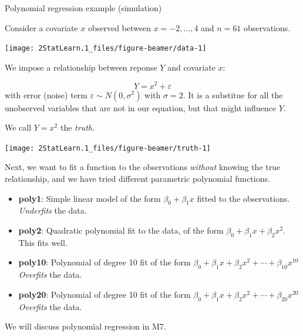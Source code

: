 \documentclass[ignorenonframetext,]{beamer}
\begin{document}
\begin{frame}

\begin{block}{Polynomial regression example (simulation)}

Consider a covariate \(x\) observed between \(x=-2, \ldots , 4\) and
\(n=61\) observations.

\begin{center}\texttt{[image: 2StatLearn.1\_files/figure-beamer/data-1]} \end{center}

\end{block}

\end{frame}

\begin{frame}

We impose a relationship between reponse \(Y\) and covariate \(x\):

\[ Y=x^2 + \varepsilon\] with error (noise) term
\(\varepsilon\sim N(0,\sigma^2)\) with \(\sigma=2\). It is a substitue
for all the unobserved variables that are not in our equation, but that
might influence \(Y\).

We call \(Y=x^2\) the \emph{truth}.

\end{frame}

\begin{frame}

\begin{center}\texttt{[image: 2StatLearn.1\_files/figure-beamer/truth-1]} \end{center}

\end{frame}

\begin{frame}

Next, we want to fit a function to the observations \emph{without}
knowing the true relationship, and we have tried different parametric
polynomial functions.

\begin{itemize}
\item
  \textbf{poly1}: Simple linear model of the form \(\beta_0+\beta_1 x\)
  fitted to the observations. \emph{Underfits} the data.
\item
  \textbf{poly2}: Quadratic polynomial fit to the data, of the form
  \(\beta_0+\beta_1 x +\beta_2 x^2\). This fits well.
\item
  \textbf{poly10}: Polynomial of degree 10 fit of the form
  \(\beta_0+\beta_1 x +\beta_2 x^2+\cdots +\beta_{10}x^{10}\)
  \emph{Overfits} the data.
\item
  \textbf{poly20}: Polynomial of degree 10 fit of the form
  \(\beta_0+\beta_1 x +\beta_2 x^2+\cdots +\beta_{20}x^{20}\)
  \emph{Overfits} the data.
\end{itemize}

We will discuss polynomial regression in M7.

\end{frame}
\end{document}
